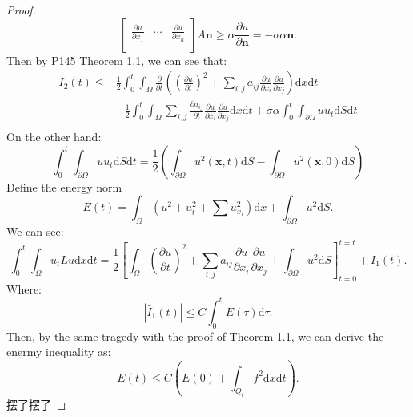 \documentclass[a4paper]{ctexart}
\newcommand{\dif}{\mathrm{d}}
\newcommand{\pdfFrac}[2]{\frac{\partial #1}{\partial #2}}
\begin{document}
\begin{proof}
\begin{equation}
\begin{bmatrix}
            \pdfFrac{u}{x_{1}}&\cdots&\pdfFrac{u}{x_{n}}\\
        \end{bmatrix}A\mathbf{n}\ge\alpha \pdfFrac{u}{\mathbf{n}}=-\sigma\alpha\mathbf{n}.
    \end{equation}
    Then by P145 Theorem 1.1, we can see that:
    \begin{equation}
        \begin{aligned}
            I_{2}(t)\le&\frac{1}{2}\int_{0}^{t}\int_{\Omega}\pdfFrac{}{t}\left(\left(\pdfFrac{u}{t}\right)^{2}+\sum_{i,j}a_{ij}\pdfFrac{u}{x_{i}}\pdfFrac{u}{x_{j}}\right)\dif x\dif t\\
            &-\frac{1}{2}\int_{0}^{t}\int_{\Omega}\sum_{i,j}\pdfFrac{a_{ij}}{t}\pdfFrac{u}{x_{i}}\pdfFrac{u}{x_{j}}\dif x\dif t+\sigma\alpha\int_{0}^{t}\int_{\partial\Omega}uu_{t}\dif S\dif t\\
        \end{aligned}
    \end{equation}
    On the other hand:
    \begin{equation}
        \int_{0}^{t}\int_{\partial\Omega}uu_{t}\dif S\dif t=\frac{1}{2}(\int_{\partial\Omega}u^{2}(\mathbf{x},t)\dif S-\int_{\partial\Omega}u^{2}(\mathbf{x},0)\dif S)
    \end{equation}
    Define the energy norm
    \begin{equation}
        \label{eq:enermy}
        E(t)=\int_{\Omega}(u^2+u_{t}^{2}+\sum u_{x_{i}}^{2})\dif x+\int_{\partial\Omega}u^{2}\dif S.
    \end{equation}
    We can see:
    \begin{equation}
        \int_{0}^{t}\int_{\Omega}u_{t}Lu\dif x\dif t=\frac{1}{2}\left[\int_{\Omega}\left(\pdfFrac{u}{t}\right)^{2}+\sum_{i,j}a_{ij}\pdfFrac{u}{x_{i}}\pdfFrac{u}{x_{j}}+\int_{\partial\Omega}u^{2}\dif S\right]_{t=0}^{t=t}+\tilde{I_{1}}(t).
    \end{equation}
    Where:
    \begin{equation}
        |\tilde{I_{1}}(t)|\le C\int_{0}^{t}E(\tau)\dif\tau.
    \end{equation}
    Then, by the same tragedy with the proof of Theorem 1.1, we can derive the enermy inequality as:
    \begin{equation}
        E(t)\le C(E(0)+\int_{Q_{t}}f^{2}\dif x\dif t).
    \end{equation}
    {\color{red}摆了摆了}
\end{proof}
\end{document}
